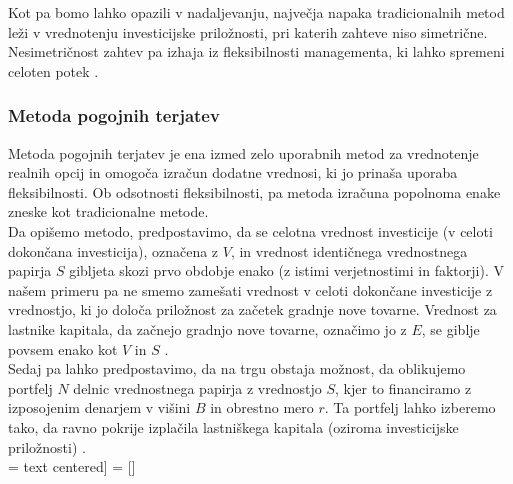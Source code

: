 Kot pa bomo lahko opazili v nadaljevanju, največja napaka tradicionalnih metod leži v vrednotenju investicijske priložnosti, pri katerih zahteve niso simetrične. Nesimetričnost zahtev pa izhaja iz fleksibilnosti managementa, ki lahko spremeni celoten potek \cite[str. 155]{Trigeorgis}. \\

\subsubsection{Metoda pogojnih terjatev}
Metoda pogojnih terjatev je ena izmed zelo uporabnih metod za vrednotenje realnih opcij in omogoča izračun dodatne vrednosi, ki jo prinaša uporaba fleksibilnosti. Ob odsotnosti fleksibilnosti, pa metoda izračuna popolnoma enake zneske kot tradicionalne metode.  \\
Da opišemo metodo, predpostavimo, da se celotna vrednost investicije (v celoti dokončana investicija), označena z $V$, in vrednost identičnega vrednostnega papirja $S$ gibljeta skozi prvo obdobje enako (z istimi verjetnostimi in faktorji). V našem primeru pa ne smemo zamešati vrednost v celoti dokončane investicije z vrednostjo, ki jo določa priložnost za začetek gradnje nove tovarne. Vrednost za lastnike kapitala, da začnejo gradnjo nove tovarne, označimo jo z $E$, se giblje povsem enako kot $V$ in $S$  \cite[str. 155, 156]{Trigeorgis}.\\
Sedaj pa lahko predpostavimo, da na trgu obstaja možnost, da oblikujemo portfelj $N$ delnic vrednostnega papirja z vrednostjo $S$, kjer to financiramo z izposojenim denarjem v višini $B$ in obrestno mero $r$. Ta portfelj lahko izberemo tako, da ravno pokrije izplačila lastniškega kapitala (oziroma investicijske priložnosti) \cite[str. 156]{Trigeorgis}. \\


 =  text centered]
 = []
\\[0,5 cm]

